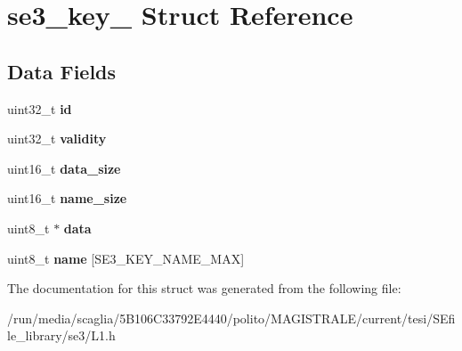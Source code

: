 \hypertarget{structse3__key__}{\section{se3\-\_\-key\-\_\- Struct Reference}
\label{structse3__key__}
}
\subsection*{Data Fields}
\begin{DoxyCompactItemize}
\item 
\hypertarget{structse3__key___ae87042442f75508344dec9065bafa5bc}{uint32\-\_\-t {\bfseries id}}\label{structse3__key___ae87042442f75508344dec9065bafa5bc}

\item 
\hypertarget{structse3__key___a81d3b415864c58f25429fa89abc6df36}{uint32\-\_\-t {\bfseries validity}}\label{structse3__key___a81d3b415864c58f25429fa89abc6df36}

\item 
\hypertarget{structse3__key___a9252864c398c0452f070fd516e00ac02}{uint16\-\_\-t {\bfseries data\-\_\-size}}\label{structse3__key___a9252864c398c0452f070fd516e00ac02}

\item 
\hypertarget{structse3__key___adc22b95114211635b01efc5a4feea75e}{uint16\-\_\-t {\bfseries name\-\_\-size}}\label{structse3__key___adc22b95114211635b01efc5a4feea75e}

\item 
\hypertarget{structse3__key___a0f0b23403bfbafae02563ba7a86ebfe4}{uint8\-\_\-t $\ast$ {\bfseries data}}\label{structse3__key___a0f0b23403bfbafae02563ba7a86ebfe4}

\item 
\hypertarget{structse3__key___abfb492c26074cbe23ba84d671b05a7c7}{uint8\-\_\-t {\bfseries name} \mbox{[}S\-E3\-\_\-\-K\-E\-Y\-\_\-\-N\-A\-M\-E\-\_\-\-M\-A\-X\mbox{]}}\label{structse3__key___abfb492c26074cbe23ba84d671b05a7c7}

\end{DoxyCompactItemize}


The documentation for this struct was generated from the following file\-:\begin{DoxyCompactItemize}
\item 
/run/media/scaglia/5\-B106\-C33792\-E4440/polito/\-M\-A\-G\-I\-S\-T\-R\-A\-L\-E/current/tesi/\-S\-Efile\-\_\-library/se3/L1.\-h\end{DoxyCompactItemize}
